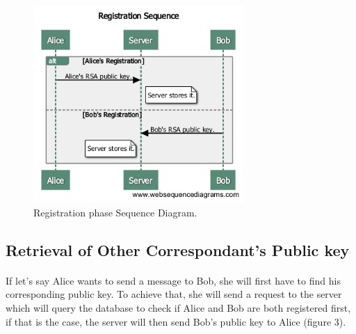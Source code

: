 	  \begin{figure}[H]
	  
	    \centering
	    \includegraphics[width=8cm]{images/architecture/registrationsequence}
	      
	    \caption{Registration phase Sequence Diagram.}
	   
	  \end{figure}
	  
	  \subsection{Retrieval of Other Correspondant's Public key}
	  
	  \paragraph{}
	  
	    If let's say Alice wants to send a message to Bob, she will first have to find his corresponding public key. To achieve that, she will send a request to the server which will query the database to check if Alice and Bob are both registered first, if that is the case, the server will then send Bob's public key to Alice (figure 3).
	    
